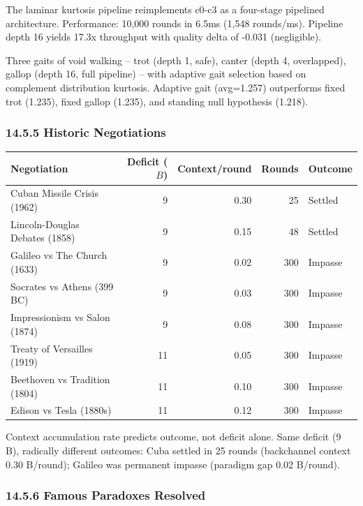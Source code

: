 \documentclass[
  11pt,
]{article}
\newcounter{none} %
\begin{document}
The laminar kurtosis pipeline reimplements c0-c3 as a four-stage
pipelined architecture. Performance: 10,000 rounds in 6.5ms (1,548
rounds/ms). Pipeline depth 16 yields 17.3x throughput with quality delta
of -0.031 (negligible).

Three gaits of void walking -- trot (depth 1, safe), canter (depth 4,
overlapped), gallop (depth 16, full pipeline) -- with adaptive gait
selection based on complement distribution kurtosis. Adaptive gait
(avg=1.257) outperforms fixed trot (1.235), fixed gallop (1.235), and
standing null hypothesis (1.218).

\subsubsection{14.5.5 Historic
Negotiations}\label{historic-negotiations}

{\def\LTcaptype{none} %
\begin{longtable}[]{@{}lrrrl@{}}
\toprule\noalign{}
Negotiation & Deficit (\(B\)) & Context/round & Rounds & Outcome \\
\midrule\noalign{}
\endhead
\bottomrule\noalign{}
\endlastfoot
Cuban Missile Crisis (1962) & 9 & 0.30 & 25 & Settled \\
Lincoln-Douglas Debates (1858) & 9 & 0.15 & 48 & Settled \\
Galileo vs The Church (1633) & 9 & 0.02 & 300 & Impasse \\
Socrates vs Athens (399 BC) & 9 & 0.03 & 300 & Impasse \\
Impressionism vs Salon (1874) & 9 & 0.08 & 300 & Impasse \\
Treaty of Versailles (1919) & 11 & 0.05 & 300 & Impasse \\
Beethoven vs Tradition (1804) & 11 & 0.10 & 300 & Impasse \\
Edison vs Tesla (1880s) & 11 & 0.12 & 300 & Impasse \\
\end{longtable}
}

Context accumulation rate predicts outcome, not deficit alone. Same
deficit (9 B), radically different outcomes: Cuba settled in 25 rounds
(backchannel context 0.30 B/round); Galileo was permanent impasse
(paradigm gap 0.02 B/round).

\subsubsection{14.5.6 Famous Paradoxes
Resolved}\label{famous-paradoxes-resolved}
\end{document}
